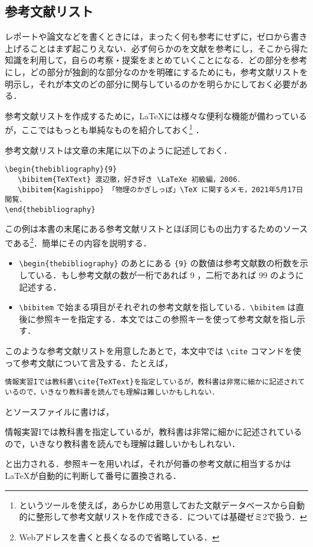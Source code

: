\subsection{参考文献リスト}

レポートや論文などを書くときには，まったく何も参考にせずに，ゼロから書き上げることはまず起こりえない．必ず何らかのを文献を参考にし，そこから得た知識を利用して，自らの考察・提案をまとめていくことになる．どの部分を参考にし，どの部分が独創的な部分なのかを明確にするためにも，参考文献リストを明示し，それが本文のどの部分に関与しているのかを明らかにしておく必要がある．

参考文献リストを作成するために，\LaTeX には様々な便利な機能が備わっているが，ここではもっとも単純なものを紹介しておく\footnote{\BibTeX というツールを使えば，あらかじめ用意しておた文献データベースから自動的に整形して参考文献リストを作成できる．\BibTeX については基礎ゼミ2で扱う．} ．

参考文献リストは文章の末尾に以下のように記述しておく．
\begin{screen}
\begin{verbatim}
\begin{thebibliography}{9}
   \bibitem{TeXText} 渡辺徹，好き好き \LaTeXe 初級編，2006．
   \bibitem{Kagishippo} 「物理のかぎしっぽ」\TeX に関するメモ，2021年5月17日閲覧．
\end{thebibliography}
\end{verbatim}
\end{screen}
この例は本書の末尾にある参考文献リストとほぼ同じもの出力するためのソースである\footnote{Webアドレスを書くと長くなるので省略している．}．簡単にその内容を説明する．
\begin{itemize}
\item \verb|\begin{thebibliography}| のあとにある \verb|{9}| の数値は参考文献数の桁数を示している．もし参考文献の数が一桁であれば 9 ，二桁であれば 99 のように記述する．
\item \verb|\bibitem| で始まる項目がそれぞれの参考文献を指している．\verb|\bibitem| は直後に参照キーを指定する．本文ではこの参照キーを使って参考文献を指し示す．
\end{itemize}
このような参考文献リストを用意したあとで，本文中では \verb|\cite| コマンドを使って参考文献について言及する．たとえば，
\begin{screen}
\begin{verbatim}
情報実習Iでは教科書\cite{TeXText}を指定しているが，教科書は非常に細かに記述されているので，いきなり教科書を読んでも理解は難しいかもしれない．
\end{verbatim}
\end{screen}
とソースファイルに書けば，
\begin{screen}
情報実習Iでは教科書\cite{TeXText}を指定しているが，教科書は非常に細かに記述されているので，いきなり教科書を読んでも理解は難しいかもしれない．
\end{screen}
と出力される．参照キーを用いれば，それが何番の参考文献に相当するかは \LaTeX が自動的に判断して番号に置換される．
